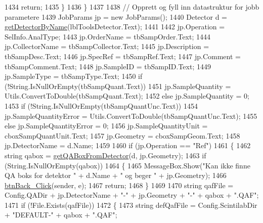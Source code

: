 \begin{DoxyCode}
1434                     \textcolor{keywordflow}{return};
1435                 \}
1436             \}
1437 
1438             \textcolor{comment}{// Opprett og fyll inn datastruktur for jobb parametere}
1439             JobParams jp = \textcolor{keyword}{new} JobParams();
1440             Detector d = \hyperlink{class_scintilab_1_1_form_main_aff4482e0919480013a53fe56cfb374ba}{getDetectorByName}(lblToolsDetector.Text);
1441 
1442             jp.Operation = SelInfo.AnalType;
1443             jp.OrderName = tbSampOrder.Text;
1444             jp.CollectorName = tbSampCollector.Text;
1445             jp.Description = tbSampDesc.Text;
1446             jp.SpecRef = tbSampRef.Text;
1447             jp.Comment = tbSampComment.Text;
1448             jp.SampleID = tbSampID.Text;
1449             jp.SampleType = tbSampType.Text;
1450             \textcolor{keywordflow}{if} (!String.IsNullOrEmpty(tbSampQuant.Text))
1451                 jp.SampleQuantity = Utils.ConvertToDouble(tbSampQuant.Text);
1452             \textcolor{keywordflow}{else} jp.SampleQuantity = 0;
1453             \textcolor{keywordflow}{if} (!String.IsNullOrEmpty(tbSampQuantUnc.Text))
1454                 jp.SampleQuantityError = Utils.ConvertToDouble(tbSampQuantUnc.Text);
1455             \textcolor{keywordflow}{else} jp.SampleQuantityError = 0;
1456             jp.SampleQuantityUnit = cboxSampQuantUnit.Text;
1457             jp.Geometry = cboxSampGeom.Text;
1458             jp.DetectorName = d.Name;
1459 
1460             \textcolor{keywordflow}{if} (jp.Operation == \textcolor{stringliteral}{"Ref"})
1461             \{
1462                 \textcolor{keywordtype}{string} qabox = \hyperlink{class_scintilab_1_1_form_main_ad8de93638ebc50f712d85af269ba383d}{getQABoxFromDetector}(d, jp.Geometry);
1463                 \textcolor{keywordflow}{if} (String.IsNullOrEmpty(qabox))
1464                 \{
1465                     MessageBox.Show(\textcolor{stringliteral}{"Kan ikke finne QA boks for detektor "} + d.Name + \textcolor{stringliteral}{" og beger "} + 
      jp.Geometry);
1466                     \hyperlink{class_scintilab_1_1_form_main_aca32a54e95297f770c9022441cb74a90}{btnBack\_Click}(sender, e);
1467                     \textcolor{keywordflow}{return};
1468                 \}
1469 
1470                 \textcolor{keywordtype}{string} qafFile = Config.QADir + jp.DetectorName + \textcolor{stringliteral}{"-"} + jp.Geometry + \textcolor{stringliteral}{"-"} + qabox + \textcolor{stringliteral}{".QAF"};
1471                 \textcolor{keywordflow}{if} (!File.Exists(qafFile))
1472                 \{
1473                     \textcolor{keywordtype}{string} defQafFile = Config.ScintilabDir + \textcolor{stringliteral}{"DEFAULT-"} + qabox + \textcolor{stringliteral}{".QAF"};

\end{DoxyCode}
